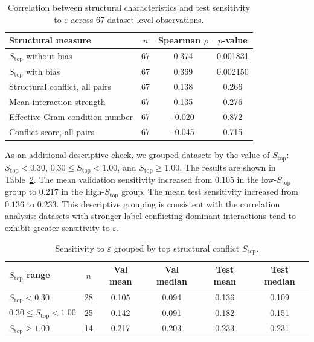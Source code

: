\documentclass[a4paper,fleqn]{cas-sc}
\begin{document}
\begin{table}[h]
\centering
\caption{Correlation between structural characteristics and test sensitivity to $\varepsilon$ across 67 dataset-level observations.}
\label{tab:eps-test-corr}
\begin{tabular}{lccc}
\hline
Structural measure & $n$ & Spearman $\rho$ & $p$-value \\
\hline
$S_{\mathrm{top}}$ without bias & 67 & 0.374 & 0.001831 \\
$S_{\mathrm{top}}$ with bias    & 67 & 0.369 & 0.002150 \\
Structural conflict, all pairs  & 67 & 0.138 & 0.266 \\
Mean interaction strength       & 67 & 0.135 & 0.276 \\
Effective Gram condition number & 67 & -0.020 & 0.872 \\
Conflict score, all pairs       & 67 & -0.045 & 0.715 \\
\hline
\end{tabular}
\end{table}

As an additional descriptive check, we grouped datasets by the value of $S_{\mathrm{top}}$: $S_{\mathrm{top}}<0.30$, $0.30\leq S_{\mathrm{top}}<1.00$, and $S_{\mathrm{top}}\geq 1.00$. The results are shown in Table~\ref{tab:eps-stop-groups}. The mean validation sensitivity increased from $0.105$ in the low-$S_{\mathrm{top}}$ group to $0.217$ in the high-$S_{\mathrm{top}}$ group. The mean test sensitivity increased from $0.136$ to $0.233$. This descriptive grouping is consistent with the correlation analysis: datasets with stronger label-conflicting dominant interactions tend to exhibit greater sensitivity to $\varepsilon$.

\begin{table}[h]
\centering
\caption{Sensitivity to $\varepsilon$ grouped by top structural conflict $S_{\mathrm{top}}$.}
\label{tab:eps-stop-groups}
\begin{tabular}{lccccc}
\hline
$S_{\mathrm{top}}$ range & $n$ & Val mean & Val median & Test mean & Test median \\
\hline
$S_{\mathrm{top}}<0.30$              & 28 & 0.105 & 0.094 & 0.136 & 0.109 \\
$0.30\leq S_{\mathrm{top}}<1.00$     & 25 & 0.142 & 0.091 & 0.182 & 0.151 \\
$S_{\mathrm{top}}\geq 1.00$          & 14 & 0.217 & 0.203 & 0.233 & 0.231 \\
\hline
\end{tabular}
\end{table}
\end{document}
